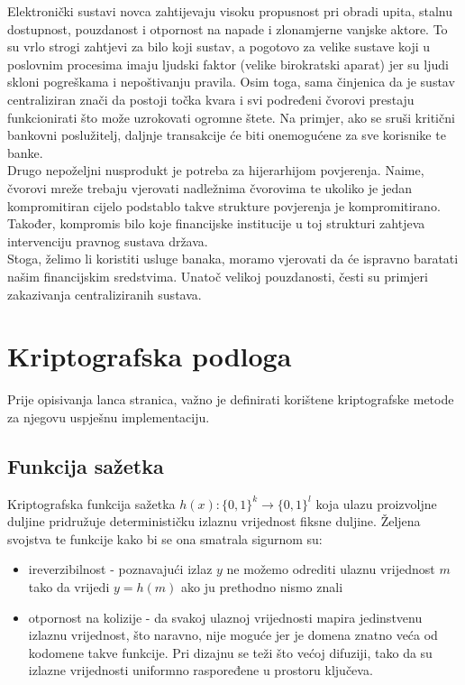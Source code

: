 \documentclass[utf8, zavrsni]{fer}
\begin{document}
Elektronički sustavi novca zahtijevaju visoku propusnost pri obradi upita, stalnu dostupnost, pouzdanost i otpornost na napade i zlonamjerne vanjske aktore. To su vrlo strogi zahtjevi za bilo koji sustav, a pogotovo za velike sustave koji u poslovnim procesima imaju ljudski faktor (velike birokratski aparat) jer su ljudi skloni pogreškama i nepoštivanju pravila. Osim toga, sama činjenica da je sustav centraliziran znači da postoji točka kvara i svi podređeni čvorovi prestaju funkcionirati što može uzrokovati ogromne štete. Na primjer, ako se sruši kritični bankovni poslužitelj, daljnje transakcije će biti onemogućene za sve korisnike te banke. \\

Drugo nepoželjni nusprodukt je potreba za hijerarhijom povjerenja. Naime, čvorovi mreže trebaju vjerovati nadležnima čvorovima te ukoliko je jedan kompromitiran cijelo podstablo takve strukture povjerenja je kompromitirano. Također, kompromis bilo koje financijske institucije u toj strukturi zahtjeva intervenciju pravnog sustava država. \\

Stoga, želimo li koristiti usluge banaka, moramo vjerovati da će ispravno baratati našim financijskim sredstvima.
Unatoč velikoj pouzdanosti, česti su primjeri zakazivanja centraliziranih sustava.

\chapter{Kriptografska podloga}
Prije opisivanja lanca stranica, važno je definirati korištene kriptografske metode za njegovu uspješnu implementaciju.
\section{Funkcija sažetka}
Kriptografska funkcija sažetka $h(x): \{0,1\}^k \rightarrow \{0,1\}^l$ koja ulazu proizvoljne duljine pridružuje determinističku izlaznu vrijednost fiksne duljine. Željena svojstva te funkcije kako bi se ona smatrala sigurnom su:

\begin{itemize}
	\item ireverzibilnost - poznavajući izlaz $y$ ne možemo odrediti ulaznu vrijednost $m$ tako da vrijedi $y = h(m)$ ako ju prethodno nismo znali
	\item otpornost na kolizije - da svakoj ulaznoj vrijednosti mapira jedinstvenu izlaznu vrijednost, što naravno, nije moguće jer je domena znatno veća od kodomene takve funkcije. Pri dizajnu se teži što većoj difuziji, tako da su izlazne vrijednosti uniformno raspoređene u prostoru ključeva.
\end{itemize}
\end{document}
